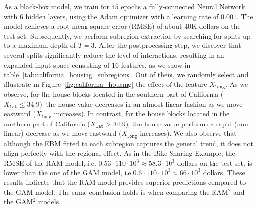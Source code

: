 \documentclass[runningheads]{llncs}
\begin{document}
As a black-box model, we train for $45$ epochs a fully-connected Neural Network with 6 hidden layers,
using the Adam optimizer with a learning rate of $0.001$.
The model achieves a root mean square error (RMSE) of about \(40\)K dollars on the test set.
Subsequently, we perform subregion extraction by searching for splits up to a maximum depth of \(T=3\).
After the postprocessing step, we discover that several splits significantly reduce the level of interactions,
resulting in an expanded input space consisting of \(16\) features, as we show in table~\ref{tab:california_housing_subregions}.
Out of them, we randomly select and illustrate in Figure~\ref{fig:california_housing} the effect of the feature $X_{\mathtt{long}}$.
As we observe, for the house blocks located in the southern part of California ($X_{\mathtt{lat}} \leq 34.9$),
the house value decreases in an almost linear fashion as we move eastward ($X_{\mathtt{long}}$ increases).
In contrast, for the house blocks located in the northern part of California ($X_{\mathtt{lat}} > 34.9$),
the house value performs a rapid (non-linear) decrease as we move eastward ($X_{\mathtt{long}}$ increases).
We also observe that although the EBM fitted to each subregion captures the general trend,
it does not align perfectly with the regional effect.
As in the Bike-Sharing Example, the RMSE of the RAM model, i.e. \( 0.53 \cdot 110 \cdot 10^3 \approx 58.3 \cdot 10^3\) dollars on the test set,
is lower than the one of the GAM model, i.e.\( 0.6 \cdot 110 \cdot 10^3 \approx 66 \cdot 10^3\) dollars.
These results indicate that the RAM model provides superior predictions compared to the GAM model.
The same conclusion holds is when comparing the RAM$^2$ and the GAM$^2$ models.
\end{document}
